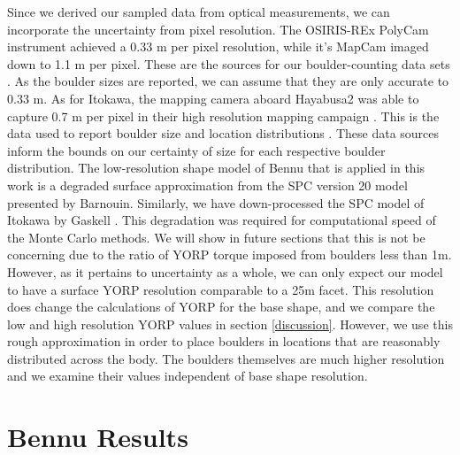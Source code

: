 Since we derived our sampled data from optical measurements, we can incorporate the uncertainty from pixel resolution. The OSIRIS-REx PolyCam instrument achieved a 0.33 m per pixel resolution, while it's MapCam imaged down to 1.1 m per pixel. These are the sources for our boulder-counting data sets \cite{DellaGiustina2019}. As the boulder sizes are reported, we can assume that they are only accurate to 0.33 m. As for Itokawa, the mapping camera aboard Hayabusa2 was able to capture 0.7 m per pixel in their high resolution mapping campaign \cite{Saito2006}. This is the data used to report boulder size and location distributions \cite{Michikami2008}. These data sources inform the bounds on our certainty of size for each respective boulder distribution.
The low-resolution shape model of Bennu that is applied in this work is a degraded surface approximation from the SPC version 20 model presented by Barnouin. Similarly, we have down-processed the SPC model of Itokawa by Gaskell \cite{Gaskell2006}. This degradation was required for computational speed of the Monte Carlo methods.
We will show in future sections that this is not be concerning due to the ratio of YORP torque imposed from boulders less than 1m. However, as it pertains to uncertainty as a whole, we can only expect our model to have a surface YORP resolution comparable to a 25m facet. This resolution does change the calculations of YORP for the base shape, and we compare the low and high resolution YORP values in section \ref{discussion}. However, we use this rough approximation in order to place boulders in locations that are reasonably distributed across the body. The boulders themselves are much higher resolution and we examine their values independent of base shape resolution.



\section{Bennu Results}\label{bennu}

